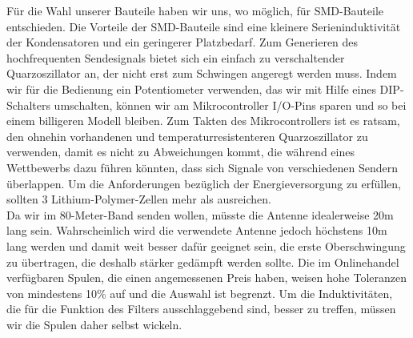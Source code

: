 Für die Wahl unserer Bauteile haben wir uns, wo möglich, für SMD-Bauteile entschieden. Die Vorteile der SMD-Bauteile sind eine kleinere Serieninduktivität der Kondensatoren und ein geringerer Platzbedarf.
Zum Generieren des hochfrequenten Sendesignals bietet sich ein einfach zu verschaltender Quarzoszillator an, der nicht erst zum Schwingen angeregt werden muss. 
Indem wir für die Bedienung ein Potentiometer verwenden, das wir mit Hilfe eines DIP-Schalters umschalten, können wir am Mikrocontroller I/O-Pins sparen und so bei einem billigeren Modell bleiben. Zum Takten des Mikrocontrollers ist es ratsam, den ohnehin vorhandenen und temperaturresistenteren Quarzoszillator zu verwenden, damit es nicht zu Abweichungen kommt, die während eines Wettbewerbs dazu führen könnten, dass sich Signale von verschiedenen Sendern überlappen. 
Um die Anforderungen bezüglich der Energieversorgung zu erfüllen, sollten 3 Lithium-Polymer-Zellen mehr als ausreichen.\\
Da wir im 80-Meter-Band senden wollen, müsste die Antenne idealerweise 20m lang sein. Wahrscheinlich wird die verwendete Antenne jedoch höchstens 10m lang werden und damit weit besser dafür geeignet sein, die erste Oberschwingung zu übertragen, die deshalb stärker gedämpft werden sollte. Die im Onlinehandel verfügbaren Spulen, die einen angemessenen Preis haben, weisen hohe Toleranzen von mindestens 10\% auf und die Auswahl ist begrenzt. Um die Induktivitäten, die für die Funktion des Filters ausschlaggebend sind, besser zu treffen, müssen wir die Spulen daher selbst wickeln.

